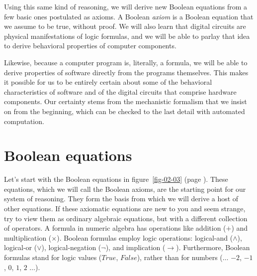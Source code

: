 Using this same kind of reasoning, we will derive new Boolean equations
from a few basic ones postulated as axioms.
A Boolean \emph{axiom} is a Boolean equation
that we assume to be true, without proof.
We will also learn that digital circuits are physical
manifestations of logic formulas, and we will be able to
parlay that idea to derive behavioral properties of
computer components.

Likewise, because a computer program is,
literally, a formula, we will be able to derive
properties of software directly from the programs themselves.
This makes it possible for us to be entirely
certain about some of the behavioral characteristics of
software and of the digital circuits that
comprise hardware components.
Our certainty stems from the mechanistic
formalism that we insist on from the beginning,
which can be checked to the last detail with automated computation.

\begin{exercises}
\label{ex:ch02-intro}


\end{exercises}

\section{Boolean equations}
\label{sec:boolean-equations}
Let's start with the Boolean equations in
figure~\ref{fig-02-03} (page \pageref{fig-02-03}).
These equations, which we will call the
Boolean axioms,
are the starting point for our system of reasoning.
They form the basis from which we will derive
a host of other equations.
If these axiomatic equations
are new to you and seem strange,
try to view them as ordinary
algebraic equations, but with a different collection of operators.
A formula in numeric algebra has operations like addition
($+$) and multiplication ($\times$). Boolean formulas employ logic
operations: logical-and ($\wedge$), logical-or ($\vee$),
logical-negation ($\neg$), and implication ($\rightarrow$).
Furthermore, Boolean formulas stand for logic values
($True$, $False$), rather than for numbers ($\dots$ $-2$, $-1$, $0$, $1$, $2$ $\dots$).

